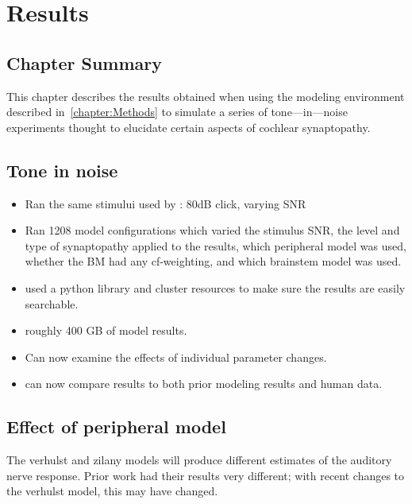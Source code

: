 \chapter{Results}
\label{chapter:Results}
\thispagestyle{myheadings}

\graphicspath{{5_Results/Figures/}}
\section{Chapter Summary} %
\label{sec:results_summary}
This chapter describes the results obtained when using the modeling environment described in~\autoref{chapter:Methods} to simulate a series of tone---in---noise experiments thought to elucidate certain aspects of cochlear synaptopathy. 


\section{Tone in noise} %
\label{sec:tone_in_noise}
\begin{itemize}
	\item Ran the same stimului used by \cite{Mehraei2015Auditory}: 80dB click, varying SNR
	\item Ran 1208 model configurations which varied  the stimulus SNR, the level and type of synaptopathy applied to the results, which peripheral model was used, whether the BM had any cf-weighting, and which brainstem model was used. 
	\item used a python library and cluster resources to make sure the results are easily searchable. 
	\item roughly 400 GB of model results.
	\item Can now examine the effects of individual parameter changes. 
	\item can now compare results to both prior modeling results and human data. 
\end{itemize}
\section{Effect of peripheral model} %
\label{sec:effect_of_peripheral_model}
The verhulst and zilany models will produce different estimates of the auditory nerve response. Prior work had their results very different; with recent changes to the verhulst model, this may have changed.

